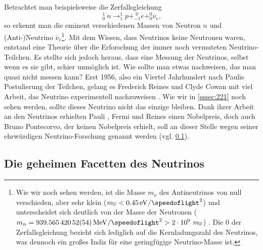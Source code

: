\documentclass[a4paper,12pt]{article}
\begin{document}
Betrachtet man beispielsweise die Zerfallsgleichung 
\begin{equation}
^1_0 \ n \rightarrow ^1_1p +_{-1}^{\hspace{4pt} 0}e + ^0_0 \overline{\nu}_e \text{,}
\label{eq:betaminuszerfall}
\end{equation}
so erkennt man die eminent verschiedenen Massen von Neutron $n$ und (Anti-)Neutrino $\overline{\nu}_e$\footnote{Wie wir noch sehen werden, ist die Masse $m_{\overline{\nu}}$ des Antineutrinos von null verschieden, aber sehr klein ($m_{\overline{\nu}}<\qty[per-mode=symbol]{,45}{\electronvolt\per\square\speedoflight}$) \cite[180]{Aker2025} und unterscheidet sich deutlich von der Masse der Neutronen ($m_n=\qty[per-mode=symbol]{939,56542052(54)}{\mega\electronvolt\per\square\speedoflight} > 2 \cdot 10^9 \ m_{\overline{\nu}}$) \cite[1347]{Tipler2024}. Die $0$ der Zerfallsgleichung bezieht sich lediglich auf die Kernladungszahl des Neutrinos, was dennoch ein großes Indiz für eine geringfügige Neutrino-Masse ist.}.
Mit dem Wissen, dass Neutrinos keine Neutronen waren, entstand eine Theorie über die Erforschung der immer noch vermuteten Neutrino-Teilchen. Es stellte sich jedoch heraus, dass eine Messung der Neutrinos, selbst wenn es sie gibt, schier unmöglich ist. Wie sollte man etwas nachweisen, das man quasi nicht messen kann? Erst 1956, also ein Viertel Jahrhundert nach Paulis Postulierung der Teilchen, gelang es Frederick Reines und Clyde Cowan mit viel Arbeit, das Neutrino experimentell nachzuweisen \cite{Cowan1956}. Wie wir in \cref{sssec:221} noch sehen werden, sollte dieses Neutrino nicht das einzige bleiben. Dank ihrer Arbeit an den Neutrinos erhielten Pauli \cite{NPOa}, Fermi \cite{NPOc} und Reines \cite{NPOb} einen Nobelpreis, doch auch Bruno Pontecorvo, der keinen Nobelpreis erhielt, soll an dieser Stelle wegen seiner ehrwürdigen Neutrino-Forschung genannt werden (vgl. \cref{ssec:22}).

\subsection{Die geheimen Facetten des Neutrinos} \label{ssec:22}
\end{document}
